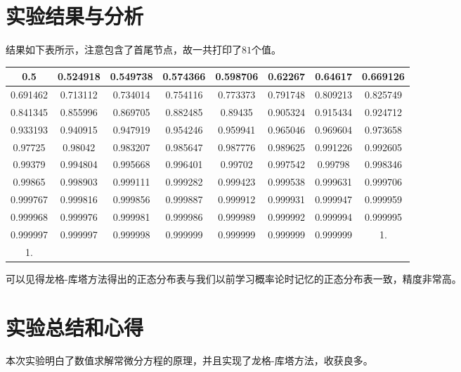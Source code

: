 \documentclass[reportComp]{thesis}
\begin{document}
\section{实验结果与分析}
结果如下表所示，注意包含了首尾节点，故一共打印了$81$个值。
\begin{table}[H]
\begin{tabular}{cccccccc}\hline
0.5 & 0.524918 & 0.549738 & 0.574366 & 0.598706 & 0.62267 & 0.64617 & 0.669126 \\\hline
0.691462 & 0.713112 & 0.734014 & 0.754116 & 0.773373 & 0.791748 & 0.809213 & 0.825749 \\\hline
0.841345 & 0.855996 & 0.869705 & 0.882485 & 0.89435 & 0.905324 & 0.915434 & 0.924712 \\\hline
0.933193 & 0.940915 & 0.947919 & 0.954246 & 0.959941 & 0.965046 & 0.969604 & 0.973658 \\\hline
0.97725 & 0.98042 & 0.983207 & 0.985647 & 0.987776 & 0.989625 & 0.991226 & 0.992605 \\\hline
0.99379 & 0.994804 & 0.995668 & 0.996401 & 0.99702 & 0.997542 & 0.99798 & 0.998346 \\\hline
0.99865 & 0.998903 & 0.999111 & 0.999282 & 0.999423 & 0.999538 & 0.999631 & 0.999706 \\\hline
0.999767 & 0.999816 & 0.999856 & 0.999887 & 0.999912 & 0.999931 & 0.999947 & 0.999959 \\\hline
0.999968 & 0.999976 & 0.999981 & 0.999986 & 0.999989 & 0.999992 & 0.999994 & 0.999995 \\\hline
0.999997 & 0.999997 & 0.999998 & 0.999999 & 0.999999 & 0.999999 & 0.999999 & 1.\\\hline
1. & & & & & & & \\\hline
\end{tabular}
\end{table}

可以见得龙格-库塔方法得出的正态分布表与我们以前学习概率论时记忆的正态分布表一致，精度非常高。

\section{实验总结和心得}
本次实验明白了数值求解常微分方程的原理，并且实现了龙格-库塔方法，收获良多。
\end{document}
